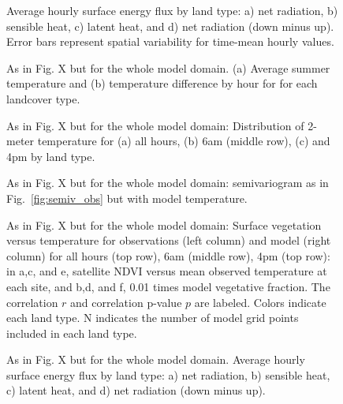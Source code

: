 \begin{figure}[h]
\centering
\caption{Average hourly surface energy flux by land type: a) net radiation, b) sensible heat, c) latent heat, and d) net radiation (down minus up). Error bars represent spatial variability for time-mean hourly values.}
\label{fig:seb}
\end{figure}

\begin{figure}[h]
\centering
\caption{As in Fig. X but for the whole model domain. (a) Average summer temperature and (b) temperature difference by hour for for each landcover type.}%
\label{fig:diurnal_wd}
\end{figure}

\begin{figure}[h]
\centering
\caption{As in Fig. X but for the whole model domain: Distribution of 2-meter temperature for (a) all hours, (b) 6am (middle row), (c) and 4pm by land type. }
\label{fig:hist_wd}
\end{figure}

\begin{figure}[h]
\centering
\caption{As in Fig. X but for the whole model domain: semivariogram as in Fig.~\ref{fig:semiv_obs} but with model temperature.}
\label{fig:semiv_model_wd}
\end{figure}

\begin{figure}[h]
\centering
\caption{As in Fig. X but for the whole model domain:  Surface vegetation versus temperature for observations (left column) and model (right column) for all hours (top row), 6am (middle row), 4pm (top row): in a,c, and e, satellite NDVI versus mean observed temperature at each site, and b,d, and f, 0.01 times model vegetative fraction. The correlation $r$ and correlation p-value $p$ are labeled. Colors indicate each land type. N indicates the number of model grid points included in each land type.}
\label{fig:veg_wd}
\end{figure}

\begin{figure}[h]
\centering
\caption{As in Fig. X but for the whole model domain. Average hourly surface energy flux by land type: a) net radiation, b) sensible heat, c) latent heat, and d) net radiation (down minus up).}
\label{fig:seb_wd}
\end{figure}

